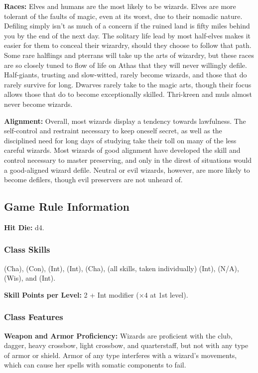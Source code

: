\textbf{Races:} Elves and humans are the most likely to be wizards. Elves are more tolerant of the faults of magic, even at its worst, due to their nomadic nature. Defiling simply isn't as much of a concern if the ruined land is fifty miles behind you by the end of the next day. The solitary life lead by most half-elves makes it easier for them to conceal their wizardry, should they choose to follow that path. Some rare halflings and pterrans will take up the arts of wizardry, but these races are so closely tuned to flow of life on Athas that they will never willingly defile. Half-giants, trusting and slow-witted, rarely become wizards, and those that do rarely survive for long. Dwarves rarely take to the magic arts, though their focus allows those that do to become exceptionally skilled. Thri-kreen and muls almost never become wizards.

\textbf{Alignment:} Overall, most wizards display a tendency towards lawfulness. The self-control and restraint necessary to keep oneself secret, as well as the disciplined need for long days of studying take their toll on many of the less careful wizards. Most wizards of good alignment have developed the skill and control necessary to master preserving, and only in the direst of situations would a good-aligned wizard defile. Neutral or evil wizards, however, are more likely to become defilers, though evil preservers are not unheard of.

\subsection{Game Rule Information}

\textbf{Hit Die:} d4.

\subsubsection{Class Skills}
 (Cha),  (Con),  (Int),  (Int),  (Cha),  (all skills, taken individually) (Int),  (N/A),  (Wis), and  (Int).

\textbf{Skill Points per Level:} 2 + Int modifier ($\times4$ at 1st level).

\subsubsection{Class Features}
\textbf{Weapon and Armor Proficiency:} Wizards are proficient with the club, dagger, heavy crossbow, light crossbow, and quarterstaff, but not with any type of armor or shield. Armor of any type interferes with a wizard's movements, which can cause her spells with somatic components to fail.

